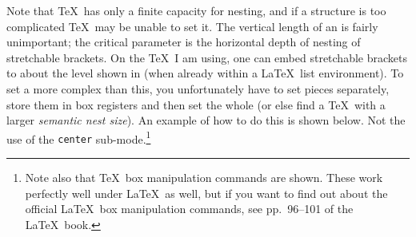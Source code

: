 Note that \TeX\ has only a finite capacity for nesting, and if a
structure is too complicated \TeX\ may be unable to set it.  The vertical
length of an {\AVM} is fairly unimportant; the critical parameter is the
horizontal depth of nesting of stretchable brackets.  On the \TeX\ I am
using, one can embed
stretchable brackets to about the level shown in  (when
already within a
\LaTeX\ list environment).  To set a
more complex {\AVM} than this, you unfortunately have to set pieces
separately, store them in box registers and then set the whole {\AVM} (or
else find a \TeX\ with a larger {\em semantic nest size\/}).  An example of
how to do this is shown below.  Not the use of the {\tt center}
sub-mode.\footnote 
 {Note also that \TeX\ box manipulation commands are shown.  These work
  perfectly well under \LaTeX\ as well, but if you want to find out about the
  official \LaTeX\ box manipulation commands, see pp.~96--101 of the \LaTeX\
  book.} 
%
